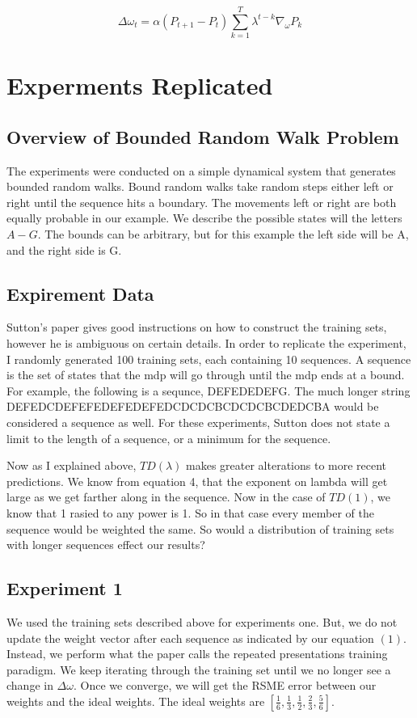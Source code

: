 \documentclass{article}
\begin{document}
\begin{equation}
\Delta\omega_{t} = \alpha(P_{t+1} - P_{t})\sum_{k=1}^{T} \lambda^{t-k}\nabla_{\omega}P_{k}
\end{equation}

\section{Experments Replicated}
\label{sec:orgheadline10}

\subsection{Overview of Bounded Random Walk Problem}
\label{sec:orgheadline3}
The experiments were conducted on a simple dynamical system that
generates bounded random walks. Bound random walks take random steps
either left or right until the sequence hits a boundary. The movements
left or right are both equally probable in our example. We describe
the possible states will the letters \(A-G\). The bounds can be
arbitrary, but for this example the left side will be A, and the right 
side is G.

\subsection{Expirement Data}
\label{sec:orgheadline4}
Sutton's paper gives good instructions on how to construct the
training sets, however he is ambiguous on certain details. In order to
replicate the experiment, I randomly generated 100 training sets, each
containing 10 sequences. A sequence is the set of states that the mdp
will go through until the mdp ends at a bound. For example, the
following is a sequnce, DEFEDEDEFG. The much
longer string DEFEDCDEFEFEDEFEDEFEDCDCDCBCDCDCBCDEDCBA would be
considered a sequence as  well. For these experiments, Sutton does not
state a limit to the length of a sequence, or a minimum for the
sequence. 

Now as I explained above, \(TD(\lambda)\) makes greater alterations
to more recent predictions. We know from equation 4, that the exponent
on lambda will get large as we get farther along in the sequence. Now
in the case of \(TD(1)\), we know that 1 rasied to any power is 1. So in
that case every member of the sequence would be weighted the same. So
would a distribution of training sets with longer sequences effect our
results? 

\subsection{Experiment 1}
\label{sec:orgheadline6}
We used the training sets described above for experiments one. But, we
do not update the weight vector after each sequence as indicated by
our equation \((1)\). Instead, we perform what the paper calls the
repeated presentations training paradigm. We keep iterating through
the training set until we no longer see a change in
\(\Delta\omega\). Once we converge, we will get the RSME error between
our weights and the ideal weights. The ideal weights are
\([\frac{1}{6},\frac{1}{3},\frac{1}{2},\frac{2}{3},\frac{5}{6}]\).
\end{document}
